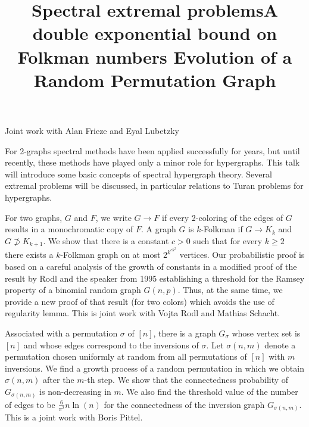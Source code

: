 \documentclass{article}
\begin{document}
Joint work with Alan Frieze and Eyal Lubetzky

\vspace{.25in}


\title{Spectral extremal problems}
\endtitle
For 2-graphs spectral methods have been applied successfully for years, but until recently, these methods have played only a minor role for hypergraphs. This talk will introduce some basic concepts of spectral hypergraph theory. Several extremal problems will be discussed, in particular relations to Turan problems for hypergraphs. 

\vspace{.25in}



\title{A double exponential bound on Folkman numbers}
\endtitle
For two graphs, $G$ and $F$, we write $G\longrightarrow F$ if every
2-coloring of the edges of $G$ results in a monochromatic copy of $F$. A
graph $G$ is $k$-Folkman if $G\longrightarrow K_k$ and $G\not\supset
K_{k+1}$. We show that there is a constant $c > 0$ such that for every $k
\ge 2$ there exists a $k$-Folkman graph on at most $2^{k^{ck^2}}$ vertices.
Our probabilistic proof is based on a careful analysis of the growth of
constants in a modified proof of the result by Rodl and the speaker from
1995 establishing a threshold for the Ramsey property of a binomial
random graph $G(n,p)$. Thus, at the same time, we provide a new proof of
that result (for two colors) which avoids the use of regularity lemma.
This is joint work with Vojta Rodl and Mathias Schacht.




\newpage

\title{ Evolution of a Random Permutation Graph}
\endtitle
Associated with a permutation $\sigma$ of $[n]$, there is a graph $G_{\sigma}$ whose vertex set is $[n]$ and whose edges correspond to the inversions of $\sigma$. Let $\sigma(n,m)$ denote a permutation chosen uniformly at random from all permutations of $[n]$ with $m$ inversions.  We find a growth process of a random permutation in which we obtain $\sigma(n,m)$ after the $m$-th step. We show that the connectedness probability of $G_{\sigma(n,m)}$ is non-decreasing in $m$. We also find the threshold value of the number of edges to be $\frac{6}{\pi^2}n\ln(n)$ for the connectedness of the inversion graph $G_{\sigma(n,m)}$. This is a joint work with Boris Pittel.
\end{document}

